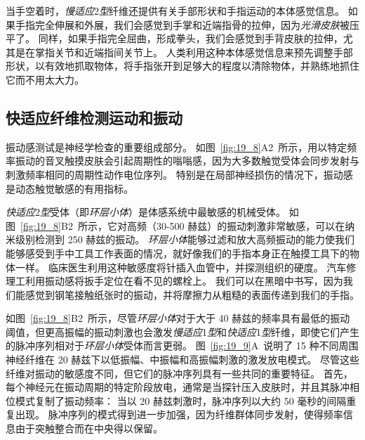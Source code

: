 当手空着时，\textit{慢适应}2\textit{型}纤维还提供有关手部形状和手指运动的本体感觉信息。
如果手指完全伸展和外展，我们会感觉到手掌和近端指骨的拉伸，因为\textit{光滑皮肤}被压平了。
同样，如果手指完全屈曲，形成拳头，我们会感觉到手背皮肤的拉伸，尤其是在掌指关节和近端指间关节上。
人类利用这种本体感觉信息来预先调整手部形状，以有效地抓取物体，将手指张开到足够大的程度以清除物体，并熟练地抓住它而不用太大力。



\subsection{快适应纤维检测运动和振动}

振动感测试是神经学检查的重要组成部分。
如图~\ref{fig:19_8}A2~所示，用以特定频率振动的音叉触摸皮肤会引起周期性的嗡嗡感，因为大多数触觉受体会同步发射与刺激频率相同的周期性动作电位序列。
特别是在局部神经损伤的情况下，振动感是动态触觉敏感的有用指标。


\textit{快适应}2\textit{型}受体（即\textit{环层小体}）是体感系统中最敏感的机械受体。
如图~\ref{fig:19_8}B2~所示，它对高频（30-500 赫兹）的振动刺激非常敏感，可以在纳米级别检测到 250 赫兹的振动。
\textit{环层小体}能够过滤和放大高频振动的能力使我们能够感受到手中工具工作表面的情况，就好像我们的手指本身正在触摸工具下的物体一样。
临床医生利用这种敏感度将针插入血管中，并探测组织的硬度。
汽车修理工利用振动感将扳手定位在看不见的螺栓上。
我们可以在黑暗中书写，因为我们能感觉到钢笔接触纸张时的振动，并将摩擦力从粗糙的表面传递到我们的手指。


如图~\ref{fig:19_8}B2~所示，尽管\textit{环层小体}对于大于 40 赫兹的频率具有最低的振动阈值，但更高振幅的振动刺激也会激发\textit{慢适应}1\textit{型}和\textit{快适应}1\textit{型}纤维，即使它们产生的脉冲序列相对于\textit{环层小体}受体而言更弱。
图~\ref{fig:19_9}A~说明了 15 种不同周围神经纤维在 20 赫兹下以低振幅、中振幅和高振幅刺激的激发放电模式。
尽管这些纤维对振动的敏感度不同，但它们的脉冲序列具有一些共同的重要特征。
首先，每个神经元在振动周期的特定阶段放电，通常是当探针压入皮肤时，并且其脉冲相位模式复制了振动频率：
当以 20 赫兹刺激时，脉冲序列以大约 50 毫秒的间隔重复出现。
脉冲序列的模式得到进一步加强，因为纤维群体同步发射，使得频率信息由于突触整合而在中央得以保留。


